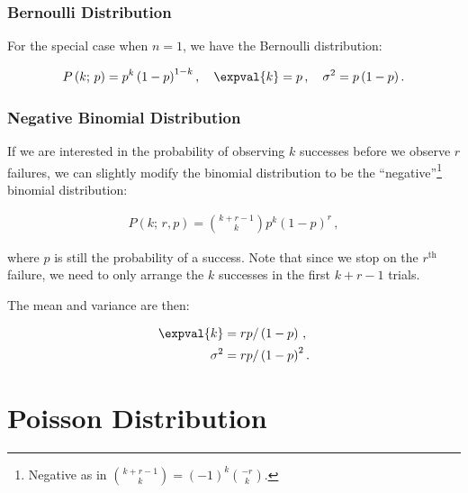 \subsubsection{Bernoulli Distribution}
\label{stats:binomial:bernoulli}

For the special case when $n=1$, we have the Bernoulli distribution:

\begin{equation}\label{eq:stats:bernoulli}
P\left(k;\,p\right) = p^{k} \left(1-p\right)^{1-k}, \quad \expval{k} = p\,, \quad \sigma^{2} = p\left(1-p\right).
\end{equation}

\subsubsection{Negative Binomial Distribution}
\label{stats:binomial:negative}

If we are interested in the probability of
observing $k$ successes before we observe $r$ failures,
we can slightly modify the binomial distribution to be
the ``negative''\footnote{Negative as in ${k+r-1 \choose k} = \left(-1\right)^{k} {-r \choose k}$.} binomial distribution:

\begin{subequations}\label{eq:stats:binomial:neg:P}
\begin{align}
P\left(k;\,r,p\right) = {k+r-1 \choose k} p^{k} \left(1-p\right)^{r}\,,
\end{align}
\end{subequations}

\noindent where $p$ is still the probability of a success.
Note that since we stop on the $r^{\text{th}}$ failure,
we need to only arrange the $k$ successes in the first $k+r-1$ trials.

The mean and variance are then:

\begin{subequations}\label{eq:stats:binomial:neg:mean_variance}
\begin{align}
\expval{k} &= r p / \left(1-p\right)\,, \label{eq:stats:binomial:neg:mean} \\
\sigma^{2} &= r p / \left(1-p\right)^{2}. \label{eq:stats:binomial:neg:variance}
\end{align}
\end{subequations}

\section{Poisson Distribution}
\label{stats:poisson}

